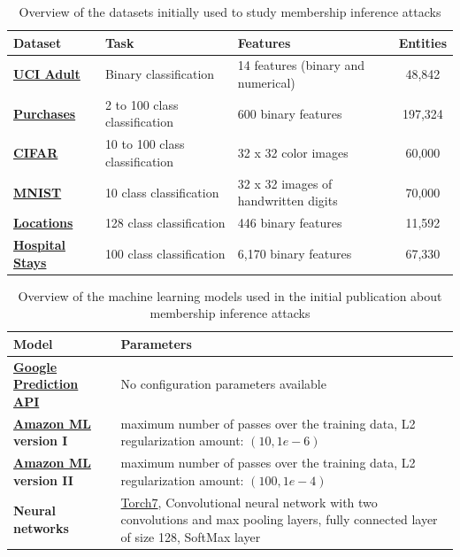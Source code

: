 \documentclass[runningheads]{llncs}
\begin{document}
\begin{table}[ht]
    \centering
    \begin{tabularx}{\textwidth}{|l|l|X|c|}
        \hline
        \textbf{Dataset} & \textbf{Task} & \textbf{Features} & \textbf{Entities} \\
        \hline
        \textbf{\href{https://archive.ics.uci.edu/ml/datasets/adult}{UCI Adult}{}} & Binary classification & 14 features (binary and numerical) &  48,842 \\
        \textbf{\href{https://www.kaggle.com/c/acquire-valued-shoppers-challenge/data}{Purchases}{}} & 2 to 100 class classification & 600 binary features & 197,324 \\
        \textbf{\href{https://www.cs.toronto.edu/~kriz/cifar.html}{CIFAR}{}} & 10 to 100 class classification & 32 x 32 color images & 60,000 \\
        \textbf{\href{http://yann.lecun.com/exdb/mnist/}{MNIST}{}} & 10 class classification & 32 x 32 images of handwritten digits & 70,000 \\
        \textbf{\href{https://sites.google.com/site/yangdingqi/home/foursquare-dataset}{Locations}{}} & 128 class classification & 446 binary features & 11,592 \\
        \textbf{\href{https://www.dshs.texas.gov/THCIC/Hospitals/Download.shtm}{Hospital Stays}{}} & 100 class classification & 6,170 binary features & 67,330 \\
        \hline
    \end{tabularx}
    \caption{Overview of the datasets initially used to study membership inference attacks \cite{shokri2017membership}}
    \label{tab:datasets-shokri}
\end{table}


\begin{table}[ht]
    \centering
    \begin{tabularx}{\textwidth}{|l|X|}
        \hline
        \textbf{Model} & \textbf{Parameters} \\
        \hline
        \textbf{\href{https://cloud.google.com/ai-platform}{Google Prediction API}} & No configuration parameters available \\
        \textbf{\href{https://aws.amazon.com/machine-learning/}{Amazon ML} version I} & maximum number of passes over the training data, L2 regularization amount: $(10, 1e - 6)$ \\
        \textbf{\href{https://aws.amazon.com/machine-learning/}{Amazon ML} version II} & maximum number of passes over the training data, L2 regularization amount: $(100, 1e - 4)$ \\
        \textbf{Neural networks} & \href{https://github.com/torch/nn}{Torch7}, Convolutional neural network with two convolutions and max pooling layers, fully connected layer of size 128, SoftMax layer \\
        \hline
    \end{tabularx}
    \caption{Overview of the machine learning models used in the initial publication about membership inference attacks \cite{shokri2017membership}}
    \label{tab:target-models-shokri}
\end{table}
\end{document}
